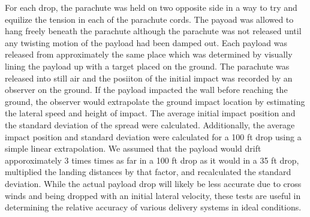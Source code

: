 \documentclass[]{auvsi_doc}
\begin{document}
For each drop, the parachute was held on two opposite side in a way to try and equilize the tension in each of the parachute cords. The payoad was allowed to hang freely beneath the parachute although the parachute was not released until any twisting motion of the payload had been damped out. Each payload was released from approximately the same place which was determined by visually lining the payload up with a target placed on the ground. The parachute was released into still air and the posiiton of the initial impact was recorded by an observer on the ground. If the payload impacted the wall before reaching the ground, the observer would extrapolate the ground impact location by estimating the lateral speed and height of impact. The average initial impact position and the standard deviation of the spread were calculated. Additionally, the average impact position and standard deviation were calculated for a 100 ft drop using a simple linear extrapolation. We assumed that the payload would drift apporoximately 3 times times as far in a 100 ft drop as it would in a 35 ft drop,  multiplied the landing distances by that factor, and recalculated the standard deviation. While the actual payload drop will likely be less accurate due to cross winds and being dropped with an initial lateral velocity, these tests are useful in determining the relative accuracy of various delivery systems in ideal conditions.
\end{document}
